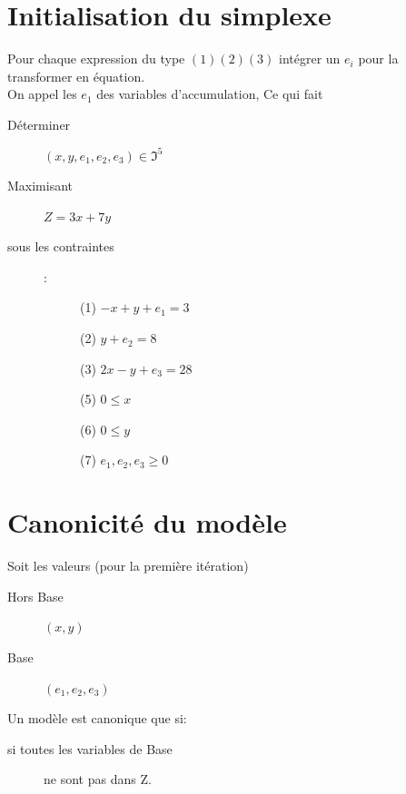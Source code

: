 \section{Initialisation du simplexe}
Pour chaque expression du type $(1)(2)(3)$ intégrer un $e_i$ pour la transformer en équation.\\
On appel les $e_1$ des variables d'accumulation, Ce qui fait\\
\begin{description}
\item[Déterminer] $(x,y,e_1,e_2,e_3) \in \Im^5$
\item[Maximisant] $Z = 3x + 7y$
\item[sous les contraintes]:
\begin{description}
\item[] (1) $ -x + y + e_1 = 3$
\item[] (2) $ y + e_2 = 8$
\item[] (3) $ 2x - y + e_3 = 28$
\item[] (5) $ 0 \leq x$
\item[] (6) $ 0 \leq y$
\item[] (7) $ e_1,e_2,e_3 \geq 0$
\end{description}
\end{description}

\section{Canonicité du modèle}
Soit les valeurs (pour la première itération)
\begin{description}
\item[Hors Base] $(x,y)$
\item[Base] $(e_1,e_2,e_3)$
\end{description}

Un modèle est canonique que si:
\begin{description}
\item[si toutes les variables de Base] ne sont pas dans Z.
\end{description}

